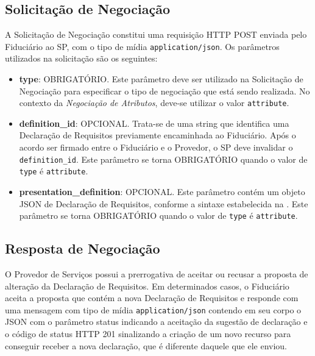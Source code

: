 

\subsection{Solicitação de Negociação}\label{subsection:negotiation-request}

A Solicitação de Negociação constitui uma requisição HTTP POST enviada pelo Fiduciário ao \acs{SP}, com o tipo de mídia \texttt{application/json}. Os parâmetros utilizados na solicitação são os seguintes:



\begin{itemize}

    \item \textbf{type}: OBRIGATÓRIO. Este parâmetro deve ser utilizado na Solicitação de Negociação para especificar o tipo de negociação que está sendo realizada. No contexto da \emph{Negociação de Atributos}, deve-se utilizar o valor \texttt{attribute}.

    \item \textbf{definition\_id}: OPCIONAL. Trata-se de uma string que identifica uma Declaração de Requisitos previamente encaminhada ao Fiduciário. Após o acordo ser firmado entre o Fiduciário e o Provedor, o \acs{SP} deve invalidar o \texttt{definition\_id}. Este parâmetro se torna OBRIGATÓRIO quando o valor de \texttt{type} é \texttt{attribute}.
    
    \item \textbf{presentation\_definition}: OPCIONAL. Este parâmetro contém um objeto JSON de Declaração de Requisitos, conforme a sintaxe estabelecida na \cite{presentation-exchange}. Este parâmetro se torna OBRIGATÓRIO quando o valor de \texttt{type} é \texttt{attribute}.
    
\end{itemize}

\subsection{Resposta de Negociação}

O Provedor de Serviços possui a prerrogativa de aceitar ou recusar a proposta de alteração da Declaração de Requisitos. Em determinados casos, o Fiduciário aceita a proposta que contém a nova Declaração de Requisitos e responde com uma mensagem com tipo de mídia \texttt{application/json} contendo em seu corpo o \acs{JSON} com o parâmetro status indicando a aceitação da sugestão de declaração e o código de status HTTP 201 sinalizando a criação de um novo recurso para conseguir receber a nova declaração, que é diferente daquele que ele enviou. 

